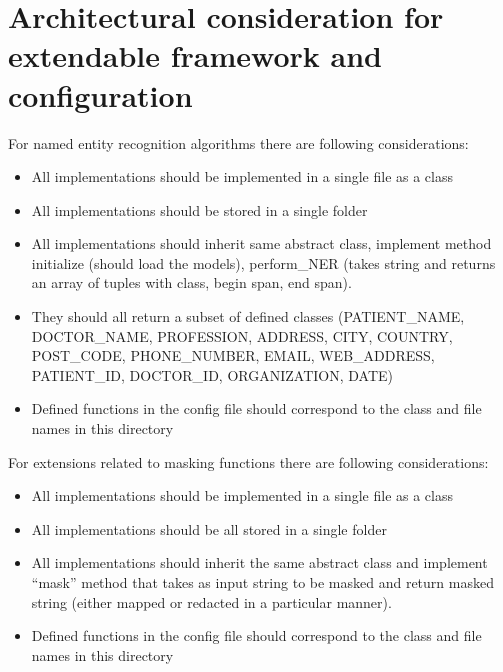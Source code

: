 \documentclass[letterpaper,10pt,english]{sphinxmanual}
\begin{document}
\section{Architectural consideration for extendable framework and configuration}
\label{\detokenize{index:architectural-consideration-for-extendable-framework-and-configuration}}
For named entity recognition algorithms there are following considerations:
\begin{itemize}
\item {} 
All implementations should be implemented in a single file as a class

\item {} 
All implementations should be stored in a single folder

\item {} 
All implementations should inherit same abstract class, implement method initialize (should load the models), perform\_NER (takes string and returns an array of tuples with class, begin span, end span).

\item {} 
They should all return a subset of defined classes (PATIENT\_NAME, DOCTOR\_NAME, PROFESSION, ADDRESS, CITY, COUNTRY, POST\_CODE, PHONE\_NUMBER, EMAIL, WEB\_ADDRESS, PATIENT\_ID, DOCTOR\_ID, ORGANIZATION, DATE)

\item {} 
Defined functions in the config file should correspond to the class and file names in this directory

\end{itemize}

For extensions related to masking functions there are following considerations:
\begin{itemize}
\item {} 
All implementations should be implemented in a single file as a class

\item {} 
All implementations should be all stored in a single folder

\item {} 
All implementations should inherit the same abstract class and implement “mask” method that takes as input string to be masked and return masked string (either mapped or redacted in a particular manner).

\item {} 
Defined functions in the config file should correspond to the class and file names in this directory

\end{itemize}
\end{document}
